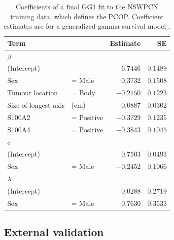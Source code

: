 \documentclass[dissertation.tex]{subfiles}
\begin{document}
\begin{table}
\centering
\caption[Final PCOP fit]{Coefficients of a final GG1 fit to the \gls{NSWPCN} training data, which defines the \gls{PCOP}.  Coefficient estimates are for a generalized gamma survival model \cite{Cox2007}.}\label{tab:nomo-final-fit}
\begin{tabular}{llrr}
\toprule
Term                   &                & Estimate       & SE      \\ \midrule
$\beta$ \\
(Intercept)            &                &  $6.7446$      & $0.1489$ \\
Sex                    & = Male         &  $0.3732$      & $0.1508$ \\
Tumour location        & = Body         & $-0.2150$      & $0.1223$ \\
Size of longest axis   &  (cm)          & $-0.0887$      & $0.0302$ \\
S100A2                 & = Positive     & $-0.3729$      & $0.1235$ \\
S100A4                 & = Positive     & $-0.3843$      & $0.1045$ \\[10]
$\sigma$ \\
(Intercept)            &                &   $0.7503$     & $0.0493$ \\
Sex                    & = Male         &  $-0.2452$     & $0.1066$ \\[10]
$\lambda$ \\
(Intercept)            &                &  $0.0288$      & $0.2719$ \\
Sex                    & = Male         &  $0.7630$      & $0.3533$ \\[5] \bottomrule
\end{tabular}
\end{table}


\subsection{External validation}
\end{document}
